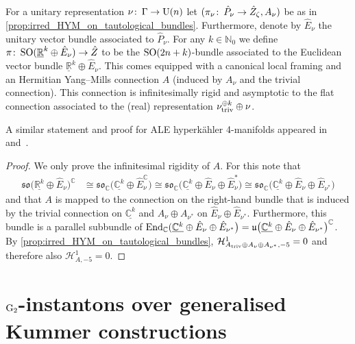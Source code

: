 \documentclass[11pt,a4paper]{scrartcl}
\newcommand{\col}{\colon \thinspace}
\newcommand{\End}{\textup{End}}
\newcommand{\G}{\textup{G}}
\newcommand{\SO}{\textup{SO}}
\newcommand{\U}{\textup{U}}
\numberwithin{equation}{section}
\theoremstyle{plain}
\theoremstyle{definition}
\theoremstyle{remark}
\begin{document}
\begin{proposition}\label{prop:rigid_SO(n)-connections}
For a unitary representation $\nu \col \Gamma \to \U(n)$ let $(\pi_\nu \col \hat{P}_\nu \to \hat{Z}_\zeta,A_\nu)$ be as in \autoref{prop:irred_HYM_on_tautological_bundles}. Furthermore, denote by $\hat{E}_\nu$ the unitary vector bundle associated to $\hat{P}_\nu$. For any $k \in \mathbb{N}_0$ we define $\pi\col \SO(\underline{\mathbb{R}}^k\oplus \hat{E}_\nu) \to \hat{Z}$ to be the $\SO(2n+k)$-bundle associated to the Euclidean vector bundle $\underline{\mathbb{R}}^k \oplus \hat{E}_\nu$. This comes equipped with a canonical local framing and an Hermitian Yang--Mills connection $A$ (induced by $A_\nu$ and the trivial connection). This connection is infinitesimally rigid and asymptotic to the flat connection associated to the (real) representation $\nu_{\textup{triv}}^{\oplus k} \oplus \nu$.
\end{proposition}
A similar statement and proof for ALE hyperkähler 4-manifolds appeared in \cite[Proof of Proposition~7.8]{GaldeanoPlattTanakaWang-spin7instantons} and~\cite[Proposition~5.22]{Walpuski-InstantonsKummer}.
\begin{proof}
We only prove the infinitesimal rigidity of $A$. For this note that
\begin{align*}
\mathfrak{so}\big(\underline{\mathbb{R}^k} \oplus \hat{E}_\nu\big)^\mathbb{C}  &\cong \mathfrak{so}_\mathbb{C}\big( \underline{\mathbb{C}^k} \oplus \hat{E}_\nu^\mathbb{C}\big) \cong \mathfrak{so}_\mathbb{C}\big( \underline{\mathbb{C}^k} \oplus \hat{E}_\nu \oplus \hat{E}_\nu^* \big) \cong \mathfrak{so}_\mathbb{C}\big( \underline{\mathbb{C}^k} \oplus \hat{E}_\nu \oplus \hat{E}_{\nu^*} \big) 
\end{align*}
and that $A$ is mapped to the connection on the right-hand bundle that is induced by the trivial connection on $\underline{\mathbb{C}^k}$ and $A_{\nu}\oplus A_{\nu^*}$ on $\hat{E}_{\nu}\oplus \hat{E}_{\nu^*}$. Furthermore, this bundle is a parallel subbundle of $\End_\mathbb{C}(\underline{\mathbb{C}^k}\oplus \hat{E}_\nu \oplus \hat{E}_{\nu^*}\big)=\mathfrak{u}\big(\underline{\mathbb{C}^k}\oplus \hat{E}_\nu \oplus \hat{E}_{\nu^*}\big)^\mathbb{C}$. By \autoref{prop:irred_HYM_on_tautological_bundles}, $\mathcal{H}^1_{A_{\textup{triv}} \oplus A_\nu \oplus A_{\nu^*},-5} = 0$ and therefore also $\mathcal{H}^1_{A,-5} = 0$.
\end{proof}


\section{$\G_2$-instantons over generalised Kummer constructions} \label{sec: instantons over Kummer}
\end{document}
